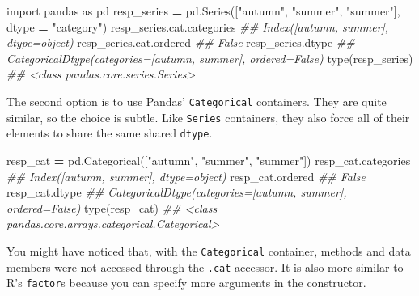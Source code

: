 \documentclass[
  12pt,
  krantz2]{krantz}
\makeatletter
\newenvironment{Shaded}{\begin{snugshade}}{\end{snugshade}}
\newcommand{\BuiltInTok}[1]{#1}
\newcommand{\CommentTok}[1]{\textcolor[rgb]{0.37,0.37,0.37}{\textit{#1}}}
\newcommand{\ImportTok}[1]{#1}
\newcommand{\NormalTok}[1]{#1}
\newcommand{\OperatorTok}[1]{\textcolor[rgb]{0.43,0.43,0.43}{\textbf{#1}}}
\newcommand{\StringTok}[1]{\textcolor[rgb]{0.5,0.5,0.5}{#1}}
\newenvironment{kframe}{%
\medskip{}
\setlength{\fboxsep}{.8em}
 \def\at@end@of@kframe{}%
 \ifinner\ifhmode%
  \def\at@end@of@kframe{\end{minipage}}%
  \begin{minipage}{\columnwidth}%
 \fi\fi%
 \def\FrameCommand##1{\hskip\@totalleftmargin \hskip-\fboxsep
 \colorbox{shadecolor}{##1}\hskip-\fboxsep
     \hskip-\linewidth \hskip-\@totalleftmargin \hskip\columnwidth}%
 \MakeFramed {\advance\hsize-\width
   \@totalleftmargin\z@ \linewidth\hsize
   \@setminipage}}%
 {\par\unskip\endMakeFramed%
 \at@end@of@kframe}
\renewenvironment{Shaded}{\begin{kframe}}{\end{kframe}}
\makeatother
\begin{document}
\begin{Shaded}
\begin{Highlighting}[]
\ImportTok{import}\NormalTok{ pandas }\ImportTok{as}\NormalTok{ pd}
\NormalTok{resp\_series }\OperatorTok{=}\NormalTok{ pd.Series([}\StringTok{"autumn"}\NormalTok{, }\StringTok{"summer"}\NormalTok{, }\StringTok{"summer"}\NormalTok{], dtype }\OperatorTok{=} \StringTok{"category"}\NormalTok{) }
\NormalTok{resp\_series.cat.categories}
\CommentTok{\#\# Index([\textquotesingle{}autumn\textquotesingle{}, \textquotesingle{}summer\textquotesingle{}], dtype=\textquotesingle{}object\textquotesingle{})}
\NormalTok{resp\_series.cat.ordered}
\CommentTok{\#\# False}
\NormalTok{resp\_series.dtype}
\CommentTok{\#\# CategoricalDtype(categories=[\textquotesingle{}autumn\textquotesingle{}, \textquotesingle{}summer\textquotesingle{}], ordered=False)}
\BuiltInTok{type}\NormalTok{(resp\_series)}
\CommentTok{\#\# \textless{}class \textquotesingle{}pandas.core.series.Series\textquotesingle{}\textgreater{}}
\end{Highlighting}
\end{Shaded}

The second option is to use Pandas' \texttt{Categorical} containers. They are quite similar, so the choice is subtle. Like \texttt{Series} containers, they also force all of their elements to share the same shared \texttt{dtype}.

\begin{Shaded}
\begin{Highlighting}[]
\NormalTok{resp\_cat }\OperatorTok{=}\NormalTok{ pd.Categorical([}\StringTok{"autumn"}\NormalTok{, }\StringTok{"summer"}\NormalTok{, }\StringTok{"summer"}\NormalTok{])}
\NormalTok{resp\_cat.categories}
\CommentTok{\#\# Index([\textquotesingle{}autumn\textquotesingle{}, \textquotesingle{}summer\textquotesingle{}], dtype=\textquotesingle{}object\textquotesingle{})}
\NormalTok{resp\_cat.ordered}
\CommentTok{\#\# False}
\NormalTok{resp\_cat.dtype}
\CommentTok{\#\# CategoricalDtype(categories=[\textquotesingle{}autumn\textquotesingle{}, \textquotesingle{}summer\textquotesingle{}], ordered=False)}
\BuiltInTok{type}\NormalTok{(resp\_cat)}
\CommentTok{\#\# \textless{}class \textquotesingle{}pandas.core.arrays.categorical.Categorical\textquotesingle{}\textgreater{}}
\end{Highlighting}
\end{Shaded}

You might have noticed that, with the \texttt{Categorical} container, methods and data members were not accessed through the \texttt{.cat} accessor. It is also more similar to R's \texttt{factor}s because you can specify more arguments in the constructor.
\end{document}
